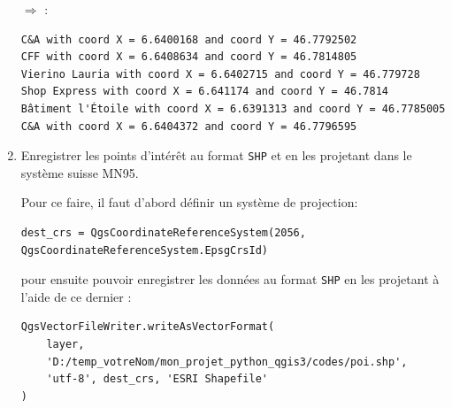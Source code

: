 \documentclass[11pt]{article}
\begin{document}
\begin{enumerate}
$\Rightarrow$ \underline{}:
\vspace*{-1em}
\begin{center}
\begin{minipage}[t]{0.80\textwidth}
\begin{verbatim}
C&A with coord X = 6.6400168 and coord Y = 46.7792502
CFF with coord X = 6.6408634 and coord Y = 46.7814805
Vierino Lauria with coord X = 6.6402715 and coord Y = 46.779728
Shop Express with coord X = 6.641174 and coord Y = 46.7814
Bâtiment l'Étoile with coord X = 6.6391313 and coord Y = 46.7785005
C&A with coord X = 6.6404372 and coord Y = 46.7796595
\end{verbatim}
\end{minipage}
\end{center}
\vspace*{1em}






\item Enregistrer les points d'intérêt au format \texttt{SHP} et en les projetant dans le système suisse MN95.

Pour ce faire, il faut d'abord définir un système de projection:
\vspace*{-2em}
\begin{center}
\begin{minipage}[t]{0.98\textwidth}
\begin{verbatim}
dest_crs = QgsCoordinateReferenceSystem(2056, QgsCoordinateReferenceSystem.EpsgCrsId)
\end{verbatim}
\end{minipage}
\end{center}
\vspace*{1em}


pour ensuite pouvoir enregistrer les données au format \texttt{SHP} en les projetant à l'aide de ce dernier : 
\vspace*{-2em}
\begin{center}
\begin{minipage}[t]{1\textwidth}
\begin{verbatim}
QgsVectorFileWriter.writeAsVectorFormat(
    layer, 
    'D:/temp_votreNom/mon_projet_python_qgis3/codes/poi.shp', 
    'utf-8', dest_crs, 'ESRI Shapefile'
)
\end{verbatim}
\end{minipage}
\end{center}
\vspace*{1em}



\end{enumerate}
\end{document}

